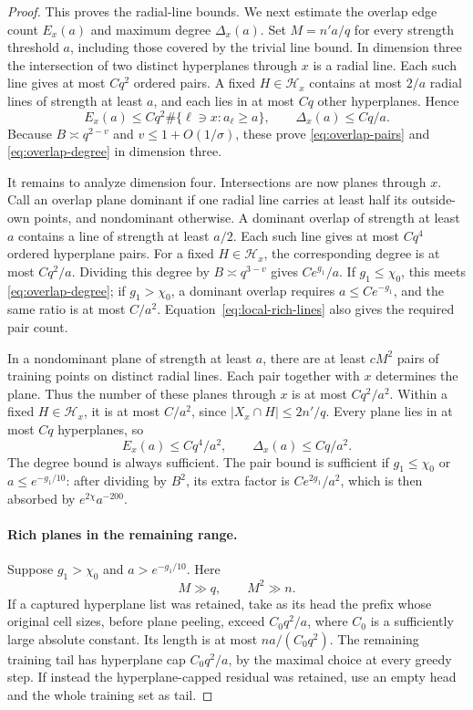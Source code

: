 \begin{proof}
This proves the radial-line bounds. We next estimate the overlap edge
count $E_x(a)$ and maximum degree $\Delta_x(a)$.
Set $M=n'a/q$ for every strength
threshold $a$, including those covered by the trivial line bound.
In dimension three the intersection of two distinct hyperplanes through
$x$ is a radial line.  Each such line gives at most $Cq^2$ ordered pairs.
A fixed $H\in\mathcal H_x$ contains at most $2/a$ radial lines of
strength at least $a$, and each lies in at most $Cq$ other hyperplanes.
Hence
\[
 E_x(a)\le Cq^2\#\{\ell\ni x:a_\ell\ge a\},\qquad
 \Delta_x(a)\le Cq/a.
\]
Because $B\asymp q^{2-v}$ and $v\le1+O(1/\sigma)$, these prove
\eqref{eq:overlap-pairs} and \eqref{eq:overlap-degree} in dimension three.

It remains to analyze dimension four.  Intersections are now planes
through $x$.  Call an overlap plane dominant if one radial line carries
at least half its outside-own points, and nondominant otherwise.  A
dominant overlap of strength at least $a$ contains a line of strength at
least $a/2$.  Each such line gives at most $Cq^4$ ordered hyperplane pairs.
For a fixed $H\in\mathcal H_x$, the corresponding degree is at
most $Cq^2/a$.  Dividing this degree by $B\asymp q^{3-v}$ gives
$Ce^{g_1}/a$.  If $g_1\le\chi_0$, this meets
\eqref{eq:overlap-degree}; if $g_1>\chi_0$, a dominant overlap requires
$a\le Ce^{-g_1}$, and the same ratio is at most $C/a^2$.
Equation~\eqref{eq:local-rich-lines} also gives the required pair count.

In a nondominant plane of strength at least $a$, there are at least
$cM^2$ pairs of training points on distinct radial lines.  Each pair
together with $x$ determines the plane.  Thus the number of these planes
through $x$ is at most $Cq^2/a^2$.  Within a fixed $H\in\mathcal H_x$,
it is at most $C/a^2$, since $|X_x\cap H|\le2n'/q$.
Every plane lies in at most $Cq$ hyperplanes, so
\begin{equation}\label{eq:nondominant-crude}
 E_x(a)\le Cq^4/a^2,\qquad \Delta_x(a)\le Cq/a^2.
\end{equation}
The degree bound is always sufficient.  The pair bound is sufficient if
$g_1\le\chi_0$ or $a\le e^{-g_1/10}$: after dividing by $B^2$, its
extra factor is $Ce^{2g_1}/a^2$, which is then absorbed by
$e^{2\chi}a^{-200}$.

\paragraph{Rich planes in the remaining range.}
Suppose $g_1>\chi_0$ and $a>e^{-g_1/10}$.  Here
\begin{equation}\label{eq:rich-plane-parameters}
 M\gg q,\qquad M^2\gg n.
\end{equation}
If a captured hyperplane list was retained, take as its head the prefix
whose original cell sizes, before plane peeling, exceed $C_0q^2/a$,
where $C_0$ is a sufficiently large absolute constant.  Its length is at
most $na/(C_0q^2)$.  The remaining training tail has hyperplane cap
$C_0q^2/a$, by the maximal choice at every greedy step.  If instead the
hyperplane-capped residual was retained, use an empty head and the whole
training set as tail.


\end{proof}
